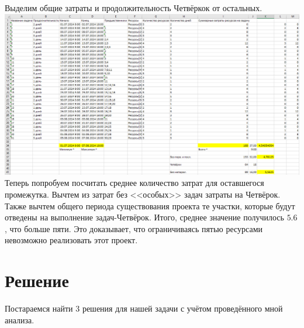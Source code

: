 \documentclass[14pt]{article}
\begin{document}
		Выделим общие затраты и продолжительность Четвёркок от остальных.\\
		\includegraphics[width=\textwidth]{../img/1a3_time_estimation.png}\\ 
		
		Теперь попробуем посчитать среднее количество затрат для оставшегося промежутка.
		Вычтем из затрат без <<особых>> задач затраты на Четвёрок.
		Также вычтем общего периода существования проекта те участки, которые будут отведены на выполнение задач-Четвёрок.
		Итого, среднее значение получилось $5.6$, что больше пяти.
		Это доказывает, что ограничиваясь пятью ресурсами невозможно реализовать этот проект.
\section{Решение}
	Постараемся найти 3 решения для нашей задачи с учётом проведённого мной анализа.
\end{document}
